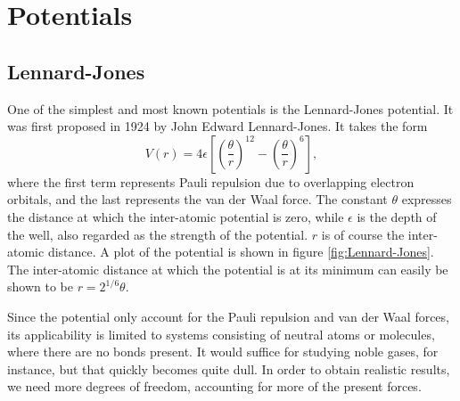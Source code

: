 \documentclass[twoside,english]{uiofysmaster}
\newcommand\lr[1]{\left(#1\right)}
\begin{document}
\section{Potentials}
\subsection{Lennard-Jones} \label{Lennard-Jones-section}
One of the simplest and most known potentials is the Lennard-Jones potential. It was first proposed in 1924 by John Edward Lennard-Jones.  It takes the form
\begin{equation}
	V(r) = 4\epsilon\left[\lr{\frac{\theta}{r}}^{12} -  \lr{\frac{\theta}{r}}^6 \right], \label{eq:Lennard-Jones}
\end{equation}
where the first term represents Pauli repulsion due to overlapping electron orbitals, and the last represents the van der Waal force. 
The constant $\theta$ expresses the distance at which the inter-atomic potential is zero, while $\epsilon$ is the depth of the well, also regarded as the strength of the potential.
$r$ is of course the inter-atomic distance. 
A plot of the potential is shown in figure \ref{fig:Lennard-Jones}.
The inter-atomic distance at which the potential is at its minimum can easily be shown to be $r=2^{1/6}\theta$. 

\begin{figure}[H]
\end{figure}

Since the potential only account for the Pauli repulsion and van der Waal forces, its applicability is limited to systems consisting of neutral atoms or molecules, where there are no bonds present. 
It would suffice for studying noble gases, for instance, but that quickly becomes quite dull. 
In order to obtain realistic results, we need more degrees of freedom, accounting for more of the present forces. 

 
\end{document}
